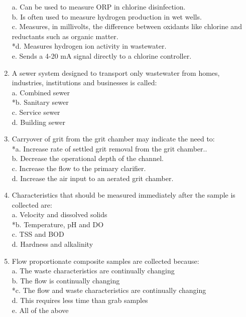 \begin{enumerate}
a. Can be used to measure ORP in chlorine disinfection. \\
b. Is often used to measure hydrogen production in wet wells. \\
c. Measures, in millivolts, the difference between oxidants like chlorine and reductants such as organic matter. \\
*d. Measures hydrogen ion activity in wastewater. \\
e. Sends a 4-20 mA signal directly to a chlorine controller. 

\vspace{0.4cm}
\item A sewer system designed to transport only wastewater from homes, industries, institutions and businesses is called: \\

a. Combined sewer \\
*b. Sanitary sewer \\
c. Service sewer \\
d. Building sewer 

\vspace{0.4cm}
\item Carryover of grit from the grit chamber may indicate the need to: \\

*a. Increase rate of settled grit removal from the grit chamber.. \\
b. Decrease the operational depth of the channel. \\
c. Increase the flow to the primary clarifier. \\
d. Increase the air input to an aerated grit chamber. 

\vspace{0.4cm}
\item Characteristics that should be measured immediately after the sample is collected are: \\

a. Velocity and dissolved solids \\
*b. Temperature, pH and DO \\
c. TSS and BOD \\
d. Hardness and alkalinity 

\vspace{0.4cm}
\item Flow proportionate composite samples are collected because: \\

a. The waste characteristics are continually changing \\
b. The flow is continually changing \\
*c. The flow and waste characteristics are continually changing \\
d. This requires less time than grab samples \\
e. All of the above 


\end{enumerate}
